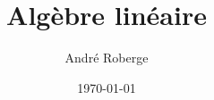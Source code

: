 \documentclass[11pt,oneside]{memoir}
\author{André Roberge}
\title{Algèbre linéaire}
\date{\small  \today}
\begin{document}


\frontmatter
	\tableofcontents*
	

\mainmatter
	
	
	 
    
    
    
	
	
	
	

\appendix
	
	
	

\printindex
\end{document}
